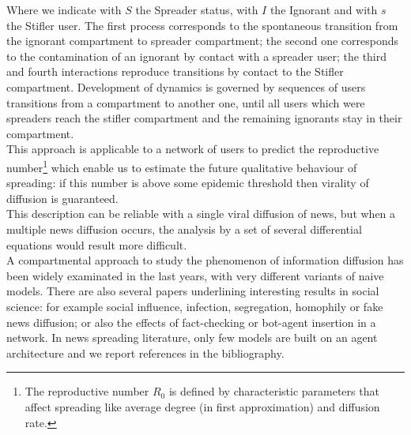 Where we indicate with $S$ the Spreader status, with $I$ the Ignorant and with $s$ the Stifler user. 
The first process corresponds to the spontaneous transition from the ignorant compartment to spreader compartment;
 the second one corresponds to the contamination of an ignorant by contact with a spreader user; 
the third and fourth interactions reproduce transitions by contact to the Stifler compartment.
Development of dynamics is governed by sequences of users transitions from a compartment to another one, until all users which were spreaders reach the stifler compartment and the remaining ignorants stay in their compartment.\\
This approach is applicable to a network of users to predict the reproductive 
number\footnote{The reproductive number $R_{0}$ is defined by characteristic parameters that affect spreading like average degree (in first approximation) and diffusion rate. } 
which enable us to estimate the future qualitative behaviour of spreading: 
if this number is above some epidemic threshold then virality of diffusion is guaranteed.\\
This description can be reliable with a single viral diffusion of news, but when a
multiple news diffusion occurs, the analysis by a set of several differential equations would result more difficult.  
 \\ A compartmental approach to study the phenomenon of information diffusion has been widely examinated in the last years, with very different variants of naive models.
There are also several papers underlining interesting results in social science: for example social influence, infection, segregation, homophily or fake news diffusion; or also the effects of fact-checking or bot-agent insertion in a network.
 In news spreading literature, only few models are built on an agent architecture and we report references in the bibliography.


